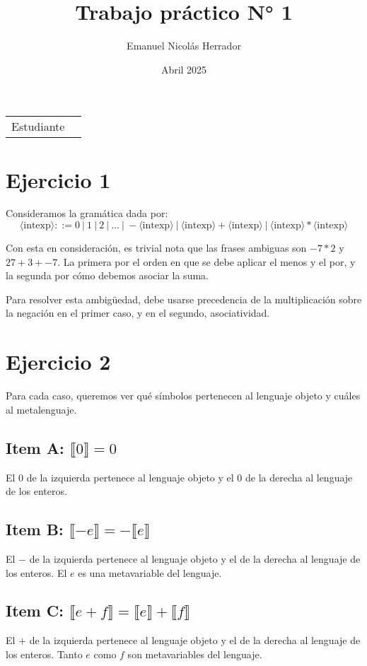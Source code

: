\documentclass{article}
\title{Trabajo práctico N° 1}
\author{Emanuel Nicolás Herrador}
\date{Abril 2025}
\newcommand{\aexp}[1]{\langle\text{#1}\rangle}
\newcommand{\intexp}{\aexp{intexp}}
\newcommand{\sem}[1]{\llbracket #1\rrbracket}
\begin{document}
\maketitle

\noindent\begin{tabular}{@{}ll}
	Estudiante & \theauthor \\
\end{tabular}

\section*{Ejercicio 1}
Consideramos la gramática dada por:
\begin{equation*}
	\intexp ::= 0\ |\ 1\ |\ 2\ |\ \dots\ |\ -\intexp\ |\ \intexp + \intexp\ |\ \intexp * \intexp
\end{equation*}

Con esta en consideración, es trivial nota que las frases ambiguas son $-7*2$ y $27+3+-7$.
La primera por el orden en que se debe aplicar el menos y el por, y la segunda por cómo debemos asociar la suma.

Para resolver esta ambigüedad, debe usarse precedencia de la multiplicación sobre la negación en el primer caso, y en el segundo, asociatividad.

\section*{Ejercicio 2}
Para cada caso, queremos ver qué símbolos pertenecen al lenguaje objeto y cuáles al metalenguaje.

\subsection*{Item A: $\sem{0} = 0$}
El $0$ de la izquierda pertenece al lenguaje objeto y el $0$ de la derecha al lenguaje de los enteros.

\subsection*{Item B: $\sem{-e} = -\sem{e}$}
El $-$ de la izquierda pertenece al lenguaje objeto y el de la derecha al lenguaje de los enteros.
El $e$ es una metavariable del lenguaje.

\subsection*{Item C: $\sem{e+f} = \sem{e} + \sem{f}$}
El $+$ de la izquierda pertenece al lenguaje objeto y el de la derecha al lenguaje de los enteros.
Tanto $e$ como $f$ son metavariables del lenguaje.
\end{document}
